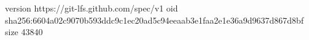 version https://git-lfs.github.com/spec/v1
oid sha256:6604a02c9070b593ddc9c1ec20ad5c94eeaab3e1faa2e1e36a9d9637d867d8bf
size 43840
